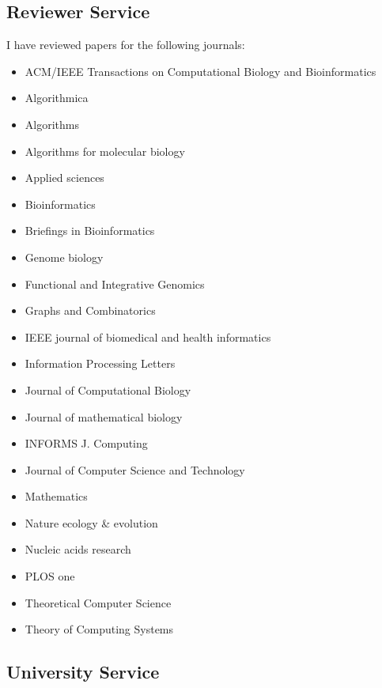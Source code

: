 \documentclass[11pt,a4paper,roman]{moderncv}
\begin{document}
\subsection{Reviewer Service}

I have reviewed papers for the following journals:
\begin{itemize}
	\item ACM/IEEE Transactions on Computational Biology and Bioinformatics
	\item Algorithmica
	\item Algorithms
	\item Algorithms for molecular biology
	\item Applied sciences
	\item Bioinformatics
	\item Briefings in Bioinformatics
	\item  Genome biology
	\item Functional and Integrative Genomics
	\item Graphs and Combinatorics
	\item IEEE journal of biomedical and health informatics
	\item Information Processing Letters
	\item Journal of Computational Biology
	\item  Journal of mathematical biology
	\item INFORMS J. Computing
	\item Journal of Computer Science and Technology
	\item Mathematics
	\item Nature ecology \& evolution
	\item Nucleic acids research
	\item PLOS one
	\item Theoretical Computer Science
	\item Theory of Computing Systems
\end{itemize}


\subsection{University Service}



\end{document}
